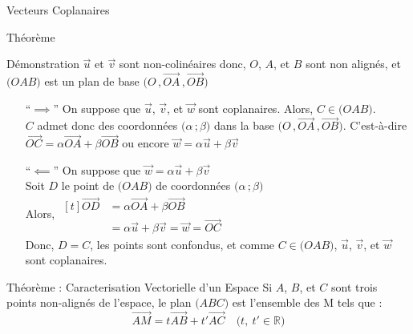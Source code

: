 \documentclass{cours}
\begin{document}
\begin{Gpartie}{Vecteurs Coplanaires}
\begin{Spartie}{Théorème}
\begin{SSpartie}{Démonstration}
                $\vec{u}$ et $\vec{v}$ sont non-colinéaires donc, $O$, $A$, et $B$ sont non alignés, et $\big(OAB\big)$ est un plan de base $\big(O\,,\overrightarrow{OA}\,,\overrightarrow{OB}\big)$
                \begin{itemize}[leftmargin=7ex]
                    \item[``$\implies$''] On suppose que $\vec{u}$, $\vec{v}$, et $\vec{w}$ sont coplanaires. Alors, $C\in\big(OAB\big)$. \\ $C$ admet donc des coordonnées $\big(\alpha\,;\beta\big)$ dans la base $\big(O\,,\overrightarrow{OA}\,,\overrightarrow{OB}\big)$. C'est-à-dire $\overrightarrow{OC}=\alpha\overrightarrow{OA}+\beta\overrightarrow{OB}$ ou encore $\vec{w}=\alpha\vec{u}+\beta\vec{v}$
                    \item[``$\impliedby$''] On suppose que $\vec{w}=\alpha\vec{u}+\beta\vec{v}$ \\ Soit $D$ le point de $\big(OAB\big)$ de coordonnées $\big(\alpha\,;\beta\big)$ \\ Alors, 
                    $\begin{aligned}[t]
                        \overrightarrow{OD}&=\alpha\overrightarrow{OA}+\beta\overrightarrow{OB} \\
                        &=\alpha\vec{u}+\beta\vec{v}=\vec{w}=\overrightarrow{OC}
                    \end{aligned}$ \\
                    Donc, $D=C$, les points sont confondus, et comme $C\in\big(OAB\big)$, $\vec{u}$, $\vec{v}$, et $\vec{w}$ sont coplanaires.
                \end{itemize}
            \end{SSpartie}
            \begin{SSpartie}{Théorème : Caracterisation Vectorielle d'un Espace} 
                Si $A$, $B$, et $C$ sont trois points non-alignés de l'espace, le plan $\big(ABC\big)$ est l'ensemble des M tels que : \[\overrightarrow{AM}=t\overrightarrow{AB}+t'\overrightarrow{AC}\quad\big(t,\ t'\in\mathbb{R}\big)\]
            \end{SSpartie}
        \end{Spartie}
    \end{Gpartie}
\end{document}
